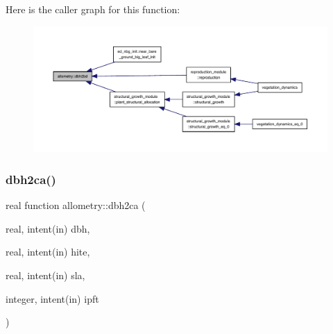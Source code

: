 Here is the caller graph for this function\+:
\nopagebreak
\begin{figure}[H]
\begin{center}
\leavevmode
\includegraphics[width=350pt]{namespaceallometry_a76db2bc4aaa47db1e2656117ec476dba_icgraph}
\end{center}
\end{figure}
\mbox{\label{namespaceallometry_abacdf8e8e585ce8d788a1fc2be133243}} 
\subsubsection{\texorpdfstring{dbh2ca()}{dbh2ca()}}
{\footnotesize\ttfamily real function allometry\+::dbh2ca (\begin{DoxyParamCaption}\item[{real, intent(in)}]{dbh,  }\item[{real, intent(in)}]{hite,  }\item[{real, intent(in)}]{sla,  }\item[{integer, intent(in)}]{ipft }\end{DoxyParamCaption})}


